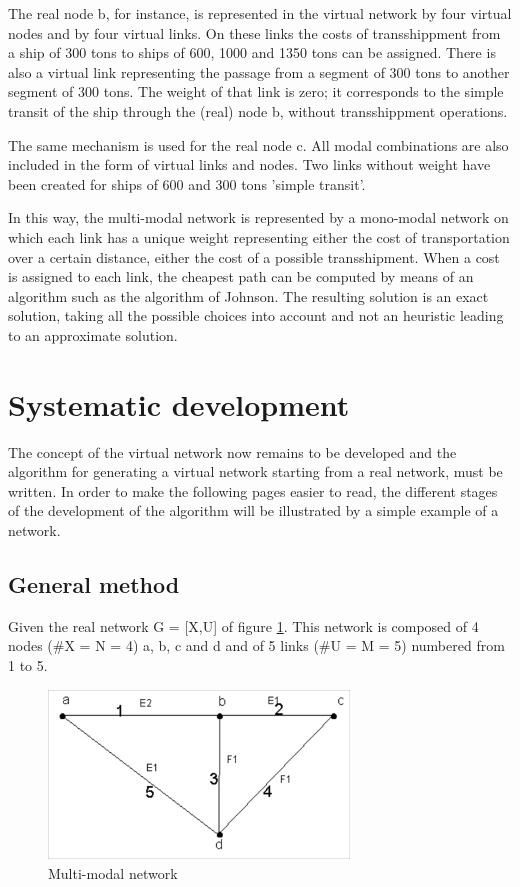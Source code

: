 The real node b, for instance, is represented in the virtual network by four
virtual nodes and by four virtual links.  On these links the costs of
transshippment from a ship of 300 tons to ships of 600, 1000 and 1350 tons can be
assigned.  There is also a virtual link representing the passage from a segment
of 300 tons to another segment of 300 tons.  The weight of that link is zero; it
corresponds to the simple transit of the ship through the (real) node b, without
transshippment operations.

The same mechanism is used for the real node c.  All modal combinations are also
included in the form of virtual links and nodes.  Two links without weight have
been created for ships of 600 and 300 tons 'simple transit'.

In this way, the multi-modal network is represented by a mono-modal network on
which each link has a unique weight representing either the cost of
transportation over a certain distance, either the cost of a possible transshipment.
When a cost is assigned to each link, the cheapest path can be
computed by means of an algorithm such as the algorithm of Johnson.  The
resulting solution is an exact solution, taking all the possible choices into
account and not an heuristic leading to an approximate solution.


\section{Systematic development}

The concept of the virtual network now remains to be developed and the algorithm
for generating a virtual network starting from a real network, must be
written.  In order to make the following pages easier to read, the different
stages of the development of the algorithm will be illustrated by a simple
example of a network.



\subsection{General method}\label{General method}


Given the real network G = [X,U] of figure  \ref{f3_3}. This network is composed
of 4 nodes (\#X = N = 4) a, b, c and d and of 5 links (\#U = M = 5) numbered from 1
to 5.


\begin{figure}[htbp]
\centerline{\includegraphics[width=8cm]{f3_3.png}}
\caption{\label{f3_3} Multi-modal network}
\end{figure}

